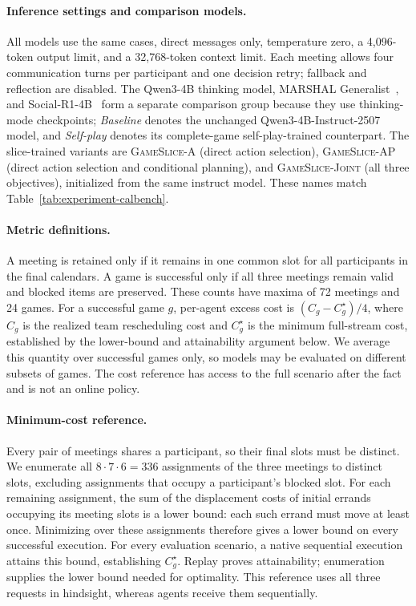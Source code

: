\paragraph{Inference settings and comparison models.}
All models use the same cases, direct messages only, temperature zero, a
4,096-token output limit, and a 32,768-token context limit. Each meeting
allows four communication turns per participant and one decision retry;
fallback and reflection are disabled. The Qwen3-4B thinking model, MARSHAL
Generalist~\citep{yuan2026marshal}, and Social-R1-4B~\citep{wu2026socialr1}
form a separate comparison group because they use thinking-mode checkpoints;
\emph{Baseline} denotes the unchanged Qwen3-4B-Instruct-2507 model, and
\emph{Self-play} denotes its complete-game self-play-trained counterpart.
The slice-trained variants are \textsc{GameSlice-A} (direct action selection),
\textsc{GameSlice-AP} (direct action selection and conditional planning), and
\textsc{GameSlice-Joint} (all three objectives), initialized from the same
instruct model. These names match Table~\ref{tab:experiment-calbench}.

\paragraph{Metric definitions.}
A meeting is retained only if it remains in one common slot for all
participants in the final calendars. A game is successful only if all three
meetings remain valid and blocked items are preserved. These counts have
maxima of 72 meetings and 24 games. For a successful game $g$, per-agent
excess cost is $(C_g-C_g^\star)/4$, where $C_g$ is the realized team
rescheduling cost and $C_g^\star$ is the minimum full-stream cost, established
by the lower-bound and attainability argument below. We average this quantity over successful games only, so
models may be evaluated on different subsets of games. The cost reference
has access to the full scenario after the fact and is not an online policy.

\paragraph{Minimum-cost reference.}
Every pair of meetings shares a participant, so their final slots must be
distinct. We enumerate all $8\cdot7\cdot6=336$ assignments of the three
meetings to distinct slots, excluding assignments that occupy a participant's
blocked slot. For each remaining assignment, the sum of the displacement
costs of initial errands occupying its meeting slots is a lower bound:
each such errand must move at least once. Minimizing over these assignments
therefore gives a lower bound on every successful execution. For every
evaluation scenario, a native sequential execution attains this bound,
establishing $C_g^\star$. Replay proves attainability; enumeration supplies
the lower bound needed for optimality. This reference uses all three
requests in hindsight, whereas agents receive them sequentially.

